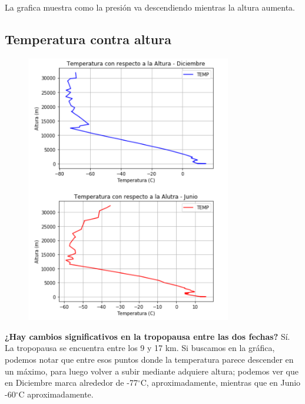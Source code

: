 \documentclass[a4paper]{article}
\begin{document}
La grafica muestra como la presión va descendiendo mientras la altura aumenta.

\pagebreak
\subsection{Temperatura contra altura}
\bigskip
 \begin{figure}[h!]
 \centering
  \includegraphics[width=0.8\textwidth]{Grafica2.PNG}
 \end{figure}
\bigskip

\textbf{¿Hay cambios significativos en la tropopausa entre las dos fechas?}
Sí. La tropopausa se encuentra entre los 9 y 17 km. Si buscamos en la gráfica, podemos notar que entre esos puntos donde la temperatura parece descender en un máximo, para luego volver a subir mediante adquiere altura; podemos ver que en Diciembre marca alrededor de -77$^\circ$C, aproximadamente, mientras que en Junio -60$^\circ$C aproximadamente.

\pagebreak
\end{document}
